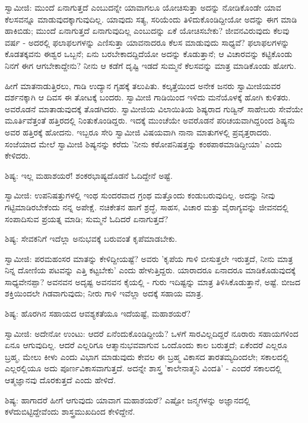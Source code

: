 ಸ್ವಾಮೀಜಿ: ಮುಂದೆ ಏನಾಗುತ್ತದೆ ಎಂಬುದನ್ನೇ ಯಾವಾಗಲೂ ಯೋಚಿಸುತ್ತಾ ಅದನ್ನು ನೋಡಿಕೊಂಡೇ ಯಾವ ಕೆಲಸವನ್ನೂ ಮಾಡುವುದಕ್ಕಾಗುವುದಿಲ್ಲ. ಯಾವುದು ಸತ್ಯ, ಸರಿಯೆಂದು ತಿಳಿದುಕೊಂಡಿದ್ದೀಯೋ ಅದನ್ನು ಈಗ ಮಾಡಿ ಹಾಕಿಬಿಡು; ಮುಂದೆ ಏನಾಗುತ್ತದೆ ಏನಾಗುವುದಿಲ್ಲ ಎಂಬುದನ್ನು ಏಕೆ ಯೋಚಿಸಬೇಕು? ಜೀವನವಿರುವುದು ಕೆಲವು ವರ್ಷ - ಅದರಲ್ಲಿ ಫಲಾಫಲಗಳನ್ನು ಎಣಿಸುತ್ತಾ ಯಾವನಾದರೂ ಕೆಲಸ ಮಾಡುವುದು ಸಾಧ್ಯವೆ? ಫಲಾಫಲಗಳನ್ನು ಕೊಡತಕ್ಕವನು ಈಶ್ವರ ಒಬ್ಬನೆ; ಏನು ಬರಬೇಕಾದದ್ದಿದೆಯೋ ಅದನ್ನು ಕೊಡುತ್ತಾನೆ; ಆ ವಿಚಾರವನ್ನು ಕಟ್ಟಿಕೊಂಡು ನಿನಗೆ ಈಗ ಆಗಬೇಕಾದ್ದೇನು? ನೀನು ಆ ಕಡೆಗೆ ದೃಷ್ಟಿ ಇಡದೆ ಸುಮ್ಮನೆ ಕೆಲಸವನ್ನು ಮಾತ್ರ ಮಾಡಿಕೊಂಡು ಹೋಗು.

ಹೀಗೆ ಮಾತನಾಡುತ್ತಿರಲು, ಗಾಡಿ ಉದ್ಯಾನ ಗೃಹಕ್ಕೆ ತಲುಪಿತು. ಕಲ್ಕತ್ತೆಯಿಂದ ಅನೇಕ ಜನರು ಸ್ವಾಮೀಜಿಯವರ ದರ್ಶನಕ್ಕಾಗಿ ಆ ದಿವಸ ಈ ತೋಟಕ್ಕೆ ಬಂದರು. ಸ್ವಾಮೀಜಿ ಗಾಡಿಯಿಂದ ಇಳಿದು ಮನೆಯೊಳಕ್ಕೆ ಹೋಗಿ ಕುಳಿತರು. ಅವರೊಡನೆ ಮಾತಾಡುವುದಕ್ಕೆ ತೊಡಗಿದರು. ಸ್ವಾಮೀಜಿಯ ವಿಲಾಯಿತಿಯ ಶಿಷ್ಯರಾದ ಗುಡ್ವಿನ್ ಸಾಹೇಬರು ಸೇವೆಯೇ ಮೂರ್ತಿವೆತ್ತಂತೆ ಹತ್ತಿರದಲ್ಲಿ ನಿಂತುಕೊಂಡಿದ್ದರು. ಇದಕ್ಕೆ ಮುಂಚೆಯೇ ಅವರೊಡನೆ ಪರಿಚಯವಾಗಿದ್ದರಿಂದ ಶಿಷ್ಯನು ಅವರ ಹತ್ತಿರಕ್ಕೆ ಹೋದನು. ಇಬ್ಬರೂ ಸೇರಿ ಸ್ವಾಮೀಜಿ ವಿಷಯವಾಗಿ ನಾನಾ ಮಾತುಗಳಲ್ಲಿ ಪ್ರವೃತ್ತರಾದರು. ಸಂಜೆಯಾದ ಮೇಲೆ ಸ್ವಾಮೀಜಿ ಶಿಷ್ಯನನ್ನು ಕರೆದು 'ನೀನು ಕಠೋಪನಿಷತ್ತನ್ನು ಕಂಠಪಾಠಮಾಡಿದ್ದೀಯಾ' ಎಂದು ಕೇಳಿದರು.

ಶಿಷ್ಯ: ಇಲ್ಲ ಮಹಾಶಯರೆ! ಶಂಕರಭಾಷ್ಯದೊಡನೆ ಓದಿದ್ದೇನೆ ಅಷ್ಟೆ.

ಸ್ವಾಮೀಜಿ: ಉಪನಿಷತ್ತುಗಳಲ್ಲಿ ಇಂಥ ಸುಂದರವಾದ ಗ್ರಂಥ ಮತ್ತೊಂದು ಕಂಡುಬರುವುದಿಲ್ಲ. ಅದನ್ನು ನೀವು ಗಟ್ಟಿಮಾಡಿರಬೇಕೆಂದು ನನ್ನ ಅಪೇಕ್ಷೆ. ನಚಿಕೇತನ ಹಾಗೆ ಶ್ರದ್ಧೆ, ಸಾಹಸ, ವಿಚಾರ ಮತ್ತು ವೈರಾಗ್ಯವನ್ನು ಜೀವನದಲ್ಲಿ ಸಂಪಾದಿಸುವ ಪ್ರಯತ್ನ ಮಾಡಿ; ಸುಮ್ಮನೆ ಓದಿದರೆ ಏನಾಗುತ್ತದೆ?

ಶಿಷ್ಯ: ಸೇವಕನಿಗೆ ಇದೆಲ್ಲಾ ಅನುಭವಕ್ಕೆ ಬರುವಂತೆ ಕೃಪೆಮಾಡಬೇಕು.

ಸ್ವಾಮೀಜಿ: ಪರಮಹಂಸರ ಮಾತನ್ನು ಕೇಳಿದ್ದೀಯಷ್ಟೆ? ಅವರು 'ಕೃಪೆಯ ಗಾಳಿ ಬೀಸುತ್ತಲೇ ಇರುತ್ತದೆ, ನೀನು ಮಾತ್ರ ನಿನ್ನ ದೋಣಿಯ ಪಟವನ್ನು ಎತ್ತಿ ಕಟ್ಟಬೇಕು' ಎಂದು ಹೇಳುತ್ತಿದ್ದರು. ಯಾರಾದರೂ ಏನಾದರೂ ಮಾಡಿಕೊಡುವುದಕ್ಕೆ ಸಾಧ್ಯವೇನಪ್ಪಾ? ಅವನವನ ಅದೃಷ್ಟ ಅವನವನ ಕೈಯಲ್ಲಿ - ಗುರು ಇದಿಷ್ಟನ್ನು ಮಾತ್ರ ತಿಳಿಸಿಕೊಡುತ್ತಾನೆ, ಅಷ್ಟೆ. ಬೀಜದ ಶಕ್ತಿಯಿಂದಲೇ ಗಿಡವಾಗುವುದು; ನೀರು ಗಾಳಿ ಇವೆಲ್ಲಾ ಅದಕ್ಕೆ ಸಹಾಯ ಮಾತ್ರ.

ಶಿಷ್ಯ: ಹೊರಗಿನ ಸಹಾಯದ ಆವಶ್ಯಕತೆಯೂ ಇದೆಯಷ್ಟೆ, ಮಹಾಶಯರೆ?

ಸ್ವಾಮೀಜಿ: ಅದೇನೋ ಉಂಟು: ಆದರೆ ಏನೆಂದುಕೊಂಡಿದ್ದೀಯೆ? ಒಳಗೆ ಸಾರವಿಲ್ಲದಿದ್ದರೆ ನೂರಾರು ಸಹಾಯಗಳಿಂದ ಏನೂ ಆಗುವುದಿಲ್ಲ. ಆದರೆ ಎಲ್ಲರಿಗೂ ಆತ್ಮಾನುಭವವಾಗುವ ಒಂದೊಂದು ಕಾಲ ಬರುತ್ತದೆ; ಏಕೆಂದರೆ ಎಲ್ಲರೂ ಬ್ರಹ್ಮ, ಮೇಲು ಕೀಳು ಎಂದು ವಿಭಾಗ ಮಾಡುವುದು ಕೇವಲ ಈ ಬ್ರಹ್ಮ ವಿಕಾಸದ ತಾರತಮ್ಯದಿಂದಲೇ; ಸಕಾಲದಲ್ಲಿ ಎಲ್ಲರಲ್ಲಿಯೂ ಅದು ಪೂರ್ಣವಿಕಾಸವಾಗುತ್ತದೆ. ಅದನ್ನೇ ಶಾಸ್ತ್ರ 'ಕಾಲೇನಾತ್ಮನಿ ವಿಂದತಿ' - ಎಂದರೆ ಸಕಾಲದಲ್ಲಿ ಆತ್ಮಜ್ಞಾನವು ದೊರಕುತ್ತದೆ ಎಂದು ಹೇಳಿದೆ.

ಶಿಷ್ಯ: ಹಾಗಾದರೆ ಹೀಗೆ ಆಗುವುದು ಯಾವಾಗ ಮಹಾಶಯರೆ? ಎಷ್ಟೋ ಜನ್ಮಗಳನ್ನು ಅಜ್ಞಾನದಲ್ಲಿ ಕಳೆದುಬಿಟ್ಟಿದ್ದೇವೆಂದು ಶಾಸ್ತ್ರಮುಖದಿಂದ ಕೇಳಿದ್ದೇನೆ.


